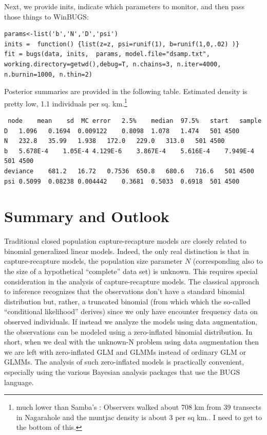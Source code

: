 Next, we provide inits, indicate which parameters to monitor, and then pass those things to WinBUGS:
\begin{verbatim}
params<-list('b','N','D','psi')
inits =  function() {list(z=z, psi=runif(1), b=runif(1,0,.02) )}
fit = bugs(data, inits,  params, model.file="dsamp.txt",
working.directory=getwd(),debug=T, n.chains=3, n.iter=4000, n.burnin=1000, n.thin=2)
\end{verbatim}
Posterior summaries are provided in the following table. Estimated density is pretty low, 1.1 individuals per sq. km.\footnote{ much lower than Samba's : Observers walked about 708 km from 39 transects in Nagarahole and the muntjac density is about 3 per sq km.. I need to get to the bottom of this.}
\begin{verbatim}
 node	 mean	 sd	 MC error	2.5%	median	97.5%	start	sample
D	1.096	0.1694	0.009122	0.8098	1.078	1.474	501	4500
N	232.8	35.99	1.938	172.0	229.0	313.0	501	4500
b	5.678E-4	1.05E-4	4.129E-6	3.867E-4	5.616E-4	7.949E-4	501	4500
deviance	681.2	16.72	0.7536	650.8	680.6	716.6	501	4500
psi	0.5099	0.08238	0.004442	0.3681	0.5033	0.6918	501	4500
\end{verbatim}


\section{Summary and Outlook}

Traditional closed population capture-recapture models are closely related to binomial generalized linear models.  Indeed, the only real distinction is that in capture-recapture models, the population size parameter $N$ (corresponding also to the size of a hypothetical ``complete'' data set) is unknown.  This requires special consideration in the analysis of capture-recapture models. The classical approach to inference recognizes that the observations don't have a standard binomial distribution but, rather, a truncated binomial (from which which the so-called ``conditional likelihood'' derives) since we only have encounter frequency data on observed individuals. If instead we analyze the models using data augmentation, the observations can be modeled using a zero-inflated binomial distribution. In short, when we deal with the unknown-N problem using data augmentation then we are left with zero-inflated GLM and GLMMs instead of ordinary GLM or GLMMs. The analysis of such zero-inflated models is practically convenient, especially using the various Bayesian analysis packages that use the BUGS language.

